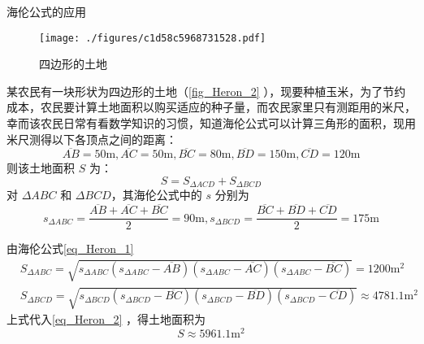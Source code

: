 \begin{example}{海伦公式的应用}
\begin{figure}[ht]
\centering
\texttt{[image: ./figures/c1d58c5968731528.pdf]}
\caption{四边形的土地}\label{fig_Heron_2}
\end{figure}
某农民有一块形状为四边形的土地（\autoref{fig_Heron_2} ），现要种植玉米，为了节约成本，农民要计算土地面积以购买适应的种子量，而农民家里只有测距用的米尺，幸而该农民日常有看数学知识的习惯，知道海伦公式可以计算三角形的面积，现用米尺测得以下各顶点之间的距离：
\begin{equation}
\overline{AB}=50\mathrm{m},\overline{AC}=50\mathrm{m},\overline{BC}=80\mathrm{m},\overline{BD}=150\mathrm{m},\overline{CD}=120\mathrm{m}
\end{equation}
则该土地面积 $S$ 为：
\begin{equation}\label{eq_Heron_2}
S=S_{\Delta ACD}+S_{\Delta BCD}
\end{equation}
对 $\Delta ABC$ 和 $\Delta BCD$，其海伦公式中的 $s$ 分别为
\begin{equation}
s_{\Delta ABC}=\frac{\overline{AB}+\overline{AC}+\overline{BC}}{2}=90\mathrm{m}
,
s_{\Delta BCD}=\frac{\overline{BC}+\overline{BD}+\overline{CD}}{2}=175\mathrm{m}
\end{equation}


由海伦公式\autoref{eq_Heron_1} 
\begin{equation}
\begin{aligned}
&S_{\Delta ABC}=\sqrt{s_{\Delta ABC}(s_{\Delta ABC}-\overline{AB})(s_{\Delta ABC}-\overline{AC})(s_{\Delta ABC}-\overline{BC})}=1200\mathrm{m^2}
\\
&S_{\Delta BCD}=\sqrt{s_{\Delta BCD}(s_{\Delta BCD}-\overline{BC})(s_{\Delta BCD}-\overline{BD})(s_{\Delta BCD}-\overline{CD})}\approx 4781.1\mathrm{m^2}
\end{aligned}
\end{equation}
上式代入\autoref{eq_Heron_2} ，得土地面积为
\begin{equation}
S\approx 5961.1\mathrm{m^2}
\end{equation}
\end{example}

